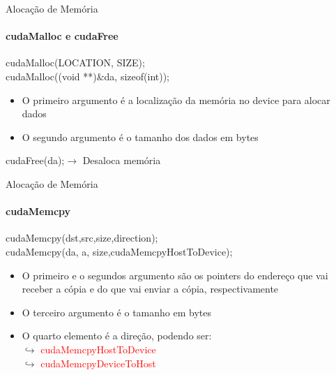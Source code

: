 \begin{frame}[t]{Alocação de Memória}
    \framesubtitle{cudaMalloc e cudaFree} 
    \Large{
    \begin{shaded}
        cudaMalloc(LOCATION, SIZE);\\
        cudaMalloc((void **)\&d\textunderscore a, sizeof(int));
    \end{shaded}
    }
    \begin{itemize}
        \item O primeiro argumento é a localização da memória no device para alocar dados
        \item O segundo argumento é o tamanho dos dados em bytes
    \end{itemize}
    \begin{shaded}
        cudaFree(d\textunderscore a);$\rightarrow$ Desaloca memória
    \end{shaded}
\end{frame}
\begin{frame}[t]{Alocação de Memória}
    \framesubtitle{cudaMemcpy} 
    \Large{
    \begin{shaded}
        cudaMemcpy(dst,src,size,direction);\\ %
        cudaMemcpy(d\textunderscore a, a, size,cudaMemcpyHostToDevice);
    \end{shaded}
    }
    \large{
    \begin{itemize}
        \item O primeiro e o segundos argumento são os pointers do endereço que vai receber a cópia e do que vai enviar a cópia, respectivamente
        \item O terceiro argumento é o tamanho em bytes
        \item O quarto elemento é a direção, podendo ser:\\$\hookrightarrow$ \textcolor{red}{cudaMemcpyHostToDevice}\\$\hookrightarrow$ \textcolor{red}{cudaMemcpyDeviceToHost}
    \end{itemize}
    }

\end{frame}
